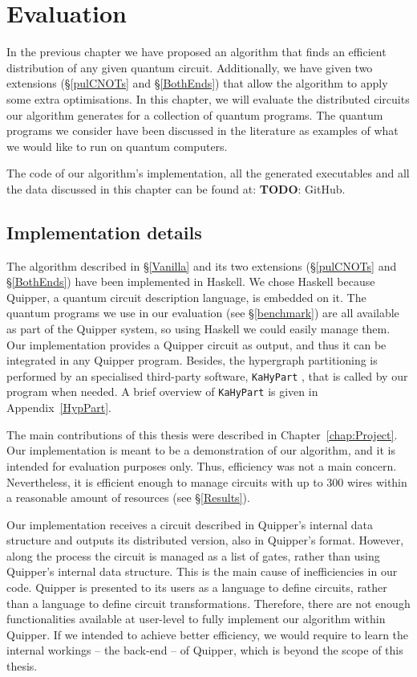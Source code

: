 \chapter{Evaluation}

In the previous chapter we have proposed an algorithm that finds an efficient distribution of any given quantum circuit. Additionally, we have given two extensions (\S\ref{pulCNOTs} and \S\ref{BothEnds}) that allow the algorithm to apply some extra optimisations. In this chapter, we will evaluate the distributed circuits our algorithm generates for a collection of quantum programs. The quantum programs we consider have been discussed in the literature as examples of what we would like to run on quantum computers.

The code of our algorithm's implementation, all the generated executables and all the data discussed in this chapter can be found at: \textbf{TODO}: GitHub. 


\section{Implementation details}
\label{implementation}

The algorithm described in \S\ref{Vanilla} and its two extensions (\S\ref{pulCNOTs} and \S\ref{BothEnds}) have been implemented in Haskell. We chose Haskell because Quipper, a quantum circuit description language, is embedded on it. The quantum programs we use in our evaluation (see \S\ref{benchmark}) are all available as part of the Quipper system, so using Haskell we could easily manage them. Our implementation provides a Quipper circuit as output, and thus it can be integrated in any Quipper program. Besides, the hypergraph partitioning is performed by an specialised third-party software, \texttt{KaHyPart} \citep{KaHyPart}, that is called by our program when needed. A brief overview of \texttt{KaHyPart} is given in Appendix~\ref{HypPart}. 

The main contributions of this thesis were described in Chapter~\ref{chap:Project}. Our implementation is meant to be a demonstration of our algorithm, and it is intended for evaluation purposes only. Thus, efficiency was not a main concern. Nevertheless, it is efficient enough to manage circuits with up to \(300\) wires within a reasonable amount of resources (see \S\ref{Results}).

Our implementation receives a circuit described in Quipper's internal data structure and outputs its distributed version, also in Quipper's format. However, along the process the circuit is managed as a list of gates, rather than using Quipper's internal data structure. This is the main cause of inefficiencies in our code. Quipper is presented to its users as a language to define circuits, rather than a language to define circuit transformations. Therefore, there are not enough functionalities available at user-level to fully implement our algorithm within Quipper. If we intended to achieve better efficiency, we would require to learn the internal workings -- the back-end -- of Quipper, which is beyond the scope of this thesis.

